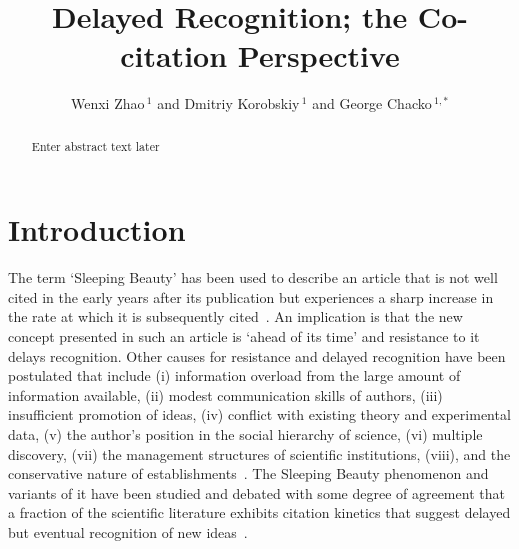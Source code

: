 \documentclass[utf8]{frontiersSCNS}
\def\firstAuthorLast{Zhao {et~al.}} %
\def\Authors{Wenxi Zhao\,$^{1}$ and Dmitriy Korobskiy\,$^{1}$  and George Chacko\,$^{1,*}$} %
\begin{document}
\onecolumn
{}

\title[Delayed Co-citations]{Delayed Recognition; the Co-citation Perspective} 

\author[\firstAuthorLast ]{\Authors} %
\address{} %
\correspondance{} %

\extraAuth{}%

\maketitle

\begin{abstract}
Enter abstract text later
\end{abstract}

\section{Introduction}

The term `Sleeping Beauty' has been used to describe an article that is not well cited in the early years after its publication but experiences a sharp increase in the rate at which it is subsequently cited~\citep{Raan2004}. An implication is that the new concept presented in such an article is `ahead of its time' and resistance to it delays recognition. Other causes for resistance and delayed recognition have been postulated that include (i) information overload from the large amount of information available, (ii)  modest communication skills of authors, (iii) insufficient promotion of ideas, (iv) conflict with existing theory and experimental data, (v) the author's position in the social hierarchy of science, (vi)  multiple discovery, (vii) the management structures of scientific institutions, (viii), and the conservative nature of establishments~\citep{Barber1961,Merton1963,Cole1970,Garfield1970a,Garfield1980a}. The Sleeping Beauty phenomenon and variants of it have been studied and debated with some degree of agreement that a fraction of the scientific literature exhibits citation kinetics that suggest delayed but eventual recognition of new ideas~\citep{Glanzel2003,Glanzel2004,Raan2004,redner_2005,Braun_2010,Li2014,Ke2015,Li2016,Song2018,sugimoto_mostafa_2018,ye_bornmann_2018,Raan2019}. 
\end{document}
